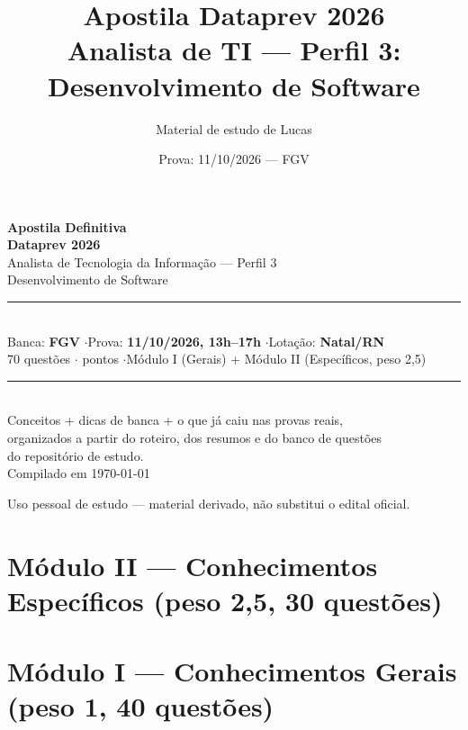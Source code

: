 \documentclass[11pt,oneside]{book}
\title{Apostila Dataprev 2026\\\Large Analista de TI --- Perfil 3: Desenvolvimento de Software}
\author{Material de estudo de Lucas}
\date{Prova: 11/10/2026 --- FGV}
\begin{document}
\begin{titlepage}
\centering
\vspace*{2cm}
{\Huge\bfseries\color{dpazul} Apostila Definitiva}\\[6pt]
{\Large\bfseries\color{dpazul} Dataprev 2026}\\[4pt]
{\large Analista de Tecnologia da Informação --- Perfil 3}\\
{\large Desenvolvimento de Software}\\[2cm]

\rule{0.6\textwidth}{0.6pt}\\[1cm]

{\large Banca: \textbf{FGV} \quad$\cdot$\quad Prova: \textbf{11/10/2026, 13h--17h} \quad$\cdot$\quad Lotação: \textbf{Natal/RN}}\\[0.5cm]
{\large 70 questões \quad$\cdot$ pontos \quad$\cdot$\quad Módulo I (Gerais) + Módulo II (Específicos, peso 2,5)}\\[2cm]

\rule{0.6\textwidth}{0.6pt}\\[1cm]

{\large Conceitos + dicas de banca + o que já caiu nas provas reais,\\
organizados a partir do roteiro, dos resumos e do banco de questões\\
do repositório de estudo.}\\[2cm]

{\normalsize Compilado em \today}

\vfill
{\small Uso pessoal de estudo --- material derivado, não substitui o edital oficial.}
\end{titlepage}

\tableofcontents
\clearpage
{}




\part{Módulo II --- Conhecimentos Específicos (peso 2,5, 30 questões)}













\part{Módulo I --- Conhecimentos Gerais (peso 1, 40 questões)}






\appendix


\end{document}

